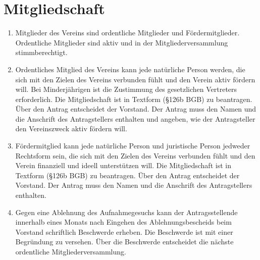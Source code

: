 \documentclass[ngerman]{article}
\begin{document}
\section{Mitgliedschaft}
\begin{enumerate}
  \item Mitglieder des Vereins sind ordentliche Mitglieder und Fördermitglieder. Ordentliche Mitglieder sind aktiv und  in der Mitgliederversammlung stimmberechtigt.  
  \item Ordentliches Mitglied des Vereins kann jede natürliche Person werden, die sich mit den Zielen des Vereins verbunden fühlt und den Verein aktiv fördern will.
  Bei Minderjährigen ist die Zustimmung des gesetzlichen Vertreters erforderlich.
Die Mitgliedschaft ist in Textform (§126b BGB) zu beantragen.
Über den Antrag entscheidet der Vorstand. Der Antrag muss den Namen und die Anschrift des Antragstellers enthalten  und  angeben, wie der Antragsteller den Vereinszweck aktiv fördern will.
  \item Fördermitglied kann jede natürliche Person und juristische Person jedweder Rechtsform sein, die sich mit den Zielen des Vereins verbunden fühlt und den Verein finanziell und ideell unterstützen will.
Die Mitgliedschaft ist in Textform (§126b BGB) zu beantragen.
Über den Antrag entscheidet der Vorstand.
Der Antrag muss den Namen und die Anschrift des Antragstellers enthalten.
  \item Gegen eine Ablehnung des Aufnahmegesuchs kann der Antragsstellende  innerhalb eines Monats nach Eingehen des Ablehnungsbescheids beim  Vorstand schriftlich Beschwerde erheben. Die Beschwerde ist mit einer Begründung zu versehen.
Über die Beschwerde entscheidet die nächste ordentliche Mitgliederversammlung.
\end{enumerate}
\end{document}
